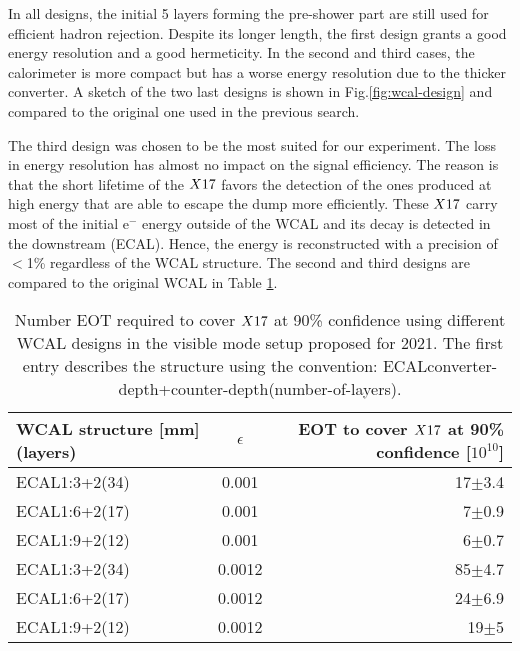 In all designs, the initial 5 layers forming the pre-shower part are still used for efficient hadron rejection. Despite its longer length, the first design grants a good energy resolution and a good hermeticity. In the second and third cases, the calorimeter is more compact but has a worse energy resolution due to the thicker converter. A sketch of the two last designs is shown in Fig.\ref{fig:wcal-design} and compared to the original one used in the previous search.

The third design was chosen to be the most suited for our experiment. The loss in energy resolution has almost no impact on the signal efficiency. The reason is that the short lifetime of the $X17$ favors the detection of the ones produced at high energy that are able to escape the dump more efficiently. These $X17$ carry most of the initial e$^-$ energy outside of the WCAL and its decay is detected in the downstream (ECAL). Hence, the energy is reconstructed with a precision of $<$1\% regardless of the WCAL structure. The second and third designs are compared to the original WCAL in Table \ref{tab:wcal-length-results}.

\begin{center}
\begin{table}[tbh!]
  \begin{tabular}{|lcr|}
  \hline
  WCAL structure [mm](layers)  & $\epsilon$  & EOT to cover $X17$ at 90\% confidence [$10^{10}$] \\
  \hline
  ECAL1:3+2(34)                & 0.001   & 17$\pm$3.4                                            \\ 
  ECAL1:6+2(17)                & 0.001   & 7$\pm$0.9                                             \\
  ECAL1:9+2(12)                & 0.001   & 6$\pm$0.7                                             \\
  ECAL1:3+2(34)                & 0.0012  & 85$\pm$4.7                                            \\
  ECAL1:6+2(17)                & 0.0012  & 24$\pm$6.9                                            \\  
  ECAL1:9+2(12)                & 0.0012  & 19$\pm$5                                              \\  
  \hline
\end{tabular}
\caption[Possible WCAL design and with their possible experimental reach]{Number EOT required to cover $X17$ at 90\% confidence using different WCAL designs in the visible mode setup proposed for 2021. The first entry describes the structure using the convention:
  ECALconverter-depth+counter-depth(number-of-layers).}
\label{tab:wcal-length-results}
\end{table}
\end{center}

